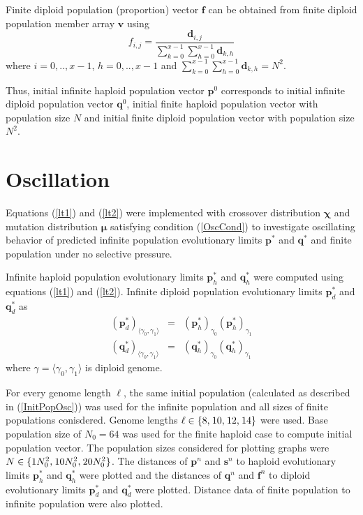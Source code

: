 Finite diploid population (proportion) vector $\bm{f}$ can be obtained from finite diploid population member array $\bm{v}$  using
\[
f_{i,j} = \frac{\bm{d}_{i,j}}{\sum \limits_{k=0}^{x-1} \sum \limits_{h=0}^{x-1} \bm{d}_{k,h}}
\]
where $i = 0,.., x-1$, $h = 0,.., x-1$ and $\sum \limits_{k=0}^{x-1} \sum \limits_{h=0}^{x-1} \bm{d}_{k,h} = N^2$.

Thus, initial infinite haploid population vector $\bm{p}^0$ corresponds to initial infinite diploid population vector $\bm{q}^0$, initial finite 
haploid population vector with population size $N$ and initial finite diploid population vector with population size $N^2$.

\section{Oscillation}
\label{Oscillation}

Equations (\ref{lt1}) and (\ref{lt2}) were implemented with crossover distribution $\bm{\chi}$ and mutation distribution $\bm{\mu}$ satisfying 
condition (\ref{OscCond}) to investigate oscillating behavior of predicted infinite population evolutionary limits $\bm{p}^{\ast}$ and $\bm{q}^{\ast}$ 
and finite population under no selective pressure.

Infinite haploid population evolutionary limits $\bm{p}_h^{\ast}$ and $\bm{q}_h^{\ast}$ were computed using equations (\ref{lt1}) and (\ref{lt2}). 
Infinite diploid population evolutionary limits $\bm{p}_d^{\ast}$ and $\bm{q}_d^{\ast}$ as
\begin{eqnarray*}
({\bm{p}_d^{\ast}})_{\langle \gamma_0, \gamma_1 \rangle} & = & ({\bm{p}_h^{\ast}})_{\gamma_0} ({\bm{p}_h^{\ast}})_{\gamma_1} \\
({\bm{q}_d^{\ast}})_{\langle \gamma_0, \gamma_1 \rangle} & = & ({\bm{q}_h^{\ast}})_{\gamma_0} ({\bm{q}_h^{\ast}})_{\gamma_1}
\end{eqnarray*}
where $\gamma = \langle \gamma_0, \gamma_1 \rangle$ is diploid genome.

For every genome length $\ell$, the same initial population (calculated as described in (\ref{InitPopOsc})) was used for the infinite population and all 
sizes of finite populations conisdered.
Genome lengths $\ell \in \{8, \hspace{0.01in}10, \hspace{0.01in}12, \hspace{0.01in}14\}$ were used. Base population size of $N_0 = 64$ was used 
for the finite haploid case to compute initial population vector. The population sizes considered for plotting 
graphs were $N \in \{1N_0^2, \hspace{0.01in}10N_0^2, \hspace{0.01in}20N_0^2\}$. 
The distances of $\bm{p}^n$ and $\bm{s}^n$ to haploid evolutionary limits $\bm{p}_h^{\ast}$ and 
$\bm{q}_h^{\ast}$ were plotted and the distances of $\bm{q}^n$ and 
$\bm{f}^n$ to diploid evolutionary limits $\bm{p}_d^{\ast}$ and $\bm{q}_d^{\ast}$ were plotted. 
Distance data of finite population to infinite population were also plotted.

